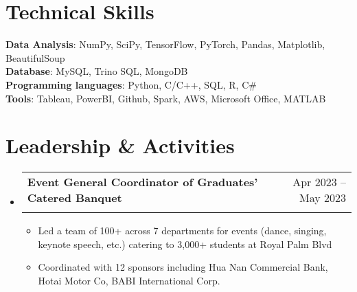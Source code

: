 \documentclass[letterpaper,11pt]{article}
\makeatletter
\newcommand{\resumeItem}[1]{
  \item\small{
    {#1 \vspace{-2pt}}
  }
}
\newcommand{\resumeSubheading}[4]{
  \vspace{-2pt}\item
    \begin{tabular*}{0.97\textwidth}[t]{l@{\extracolsep{\fill}}r}
      \textbf{#1} & #2 \\
      \textit{\small#3} & \textit{\small #4} \\
    \end{tabular*}\vspace{-7pt}
}
\newcommand{\resumeSubHeadingListStart}{\begin{itemize}[leftmargin=0.15in, label={}]}
\newcommand{\resumeSubHeadingListEnd}{\end{itemize}}
\newcommand{\resumeItemListStart}{\begin{itemize}}
\newcommand{\resumeItemListEnd}{\end{itemize}\vspace{-8pt}}
\makeatother
\begin{document}
\section{Technical Skills}
 \begin{itemize}[leftmargin=0.15in, label={}]
    \small{\item{
     \textbf{Data Analysis}{: NumPy, SciPy, TensorFlow, PyTorch, Pandas, Matplotlib, BeautifulSoup} \\      \textbf{Database}{: MySQL, Trino SQL, MongoDB} \\      \textbf{Programming languages}{: Python, C/C++, SQL, R, C\#} \\      \textbf{Tools}{: Tableau, PowerBI, Github, Spark, AWS, Microsoft Office, MATLAB}
    }}
 \end{itemize}

\section{Leadership \& Activities}
  \resumeSubHeadingListStart
    \resumeSubheading
      {\textbf{Event General Coordinator of Graduates' Catered Banquet}}{Apr 2023 -- May 2023}
      {}{}
      \resumeItemListStart
        \resumeItem{Led a team of 100+ across 7 departments for events (dance, singing, keynote speech, etc.) catering to 3,000+ students at Royal Palm Blvd}
        \resumeItem{Coordinated with 12 sponsors including Hua Nan Commercial Bank, Hotai Motor Co, BABI International Corp.}
      \resumeItemListEnd
  \resumeSubHeadingListEnd
\end{document}
